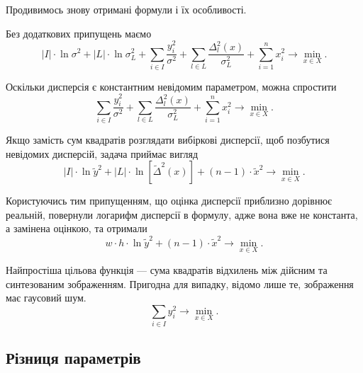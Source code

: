 Продивимось знову отримані формули і їх особливості.

Без додаткових припущень маємо
\begin{equation*}
  \left| I \right| \cdot \ln{\sigma^2}
  + \left| L \right| \cdot \ln{\sigma_L^2}
  + \sum_{i \in I} \frac{ y_i^2}{\sigma^2}
  + \sum_{l \in L} \frac{ \Delta_l^2\left( x \right)}{\sigma_L^2}
  + \sum_{i = 1}^n x_i^2
  \to \min\limits_{x \in X}.
\end{equation*}

Оскільки дисперсія є константним невідомим параметром,
можна спростити
\begin{equation*}
  \sum_{i \in I} \frac{ y_i^2}{\sigma^2}
  + \sum_{l \in L} \frac{ \Delta_l^2\left( x \right)}{\sigma_L^2}
  + \sum_{i = 1}^n x_i^2
  \to \min\limits_{x \in X}.
\end{equation*}

Якщо замість сум квадратів розглядати вибіркові дисперсії,
щоб позбутися невідомих дисперсій, задача приймає вигляд
\begin{equation*}
  \left| I \right|
  \cdot \ln{\widetilde{y}^2}
  + \left| L \right|
  \cdot \ln{\left[ \widetilde{\Delta}^2\left( x \right) \right]}
  + \left( n - 1 \right) \cdot \widetilde{x}^2
  \to \min\limits_{x \in X}.
\end{equation*}

Користуючись тим припущенням,
що оцінка дисперсії приблизно дорівнює реальній,
повернули логарифм дисперсії в формулу,
адже вона вже не константа, а замінена оцінкою, та отримали
\begin{equation*}
  w \cdot h \cdot \ln{\widetilde{y}^2}
  + \left( n - 1 \right) \cdot \widetilde{x}^2
  \to \min\limits_{x \in X}.
\end{equation*}

Найпростіша цільова функція --- сума квадратів відхилень
між дійсним та синтезованим зображенням.
Пригодна для випадку, відомо лише те, зображення має гаусовий шум.
\begin{equation*}
  \sum_{i \in I} y_i^2
  \to \min\limits_{x \in X}.
\end{equation*}


\subsection{Різниця параметрів}


